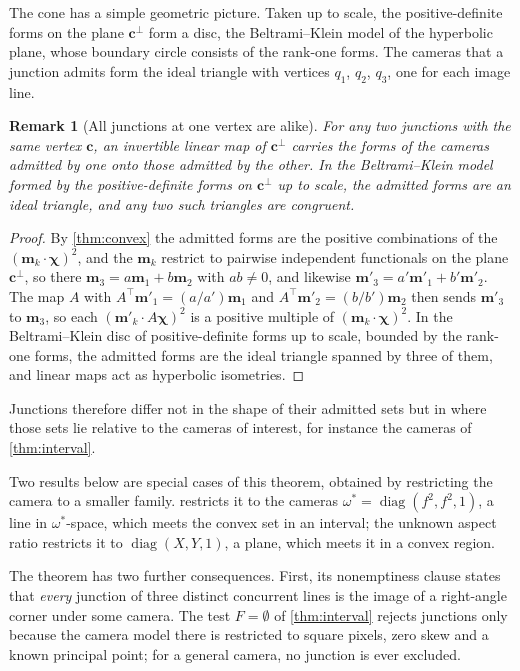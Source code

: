 \documentclass[pdflatex,sn-mathphys-num,iicol]{sn-jnl}
\newcommand{\vc}{\mathbf{c}}
\newcommand{\vm}{\mathbf{m}}
\theoremstyle{thmstyleone}
\theoremstyle{thmstylethree}
\theoremstyle{thmstyletwo}
\newtheorem{remark}[theorem]{Remark}
\begin{document}
The cone has a simple geometric picture. Taken up to scale, the positive-definite forms on the plane $\vc^{\perp}$ form a disc, the Beltrami--Klein model of the hyperbolic plane, whose boundary circle consists of the rank-one forms. The cameras that a junction admits form the ideal triangle with vertices $q_1$, $q_2$, $q_3$, one for each image line.

\begin{remark}[All junctions at one vertex are alike]\label{cor:alike}
For any two junctions with the same vertex $\vc$, an invertible linear map of $\vc^{\perp}$ carries the forms of the cameras admitted by one onto those admitted by the other. In the Beltrami--Klein model formed by the positive-definite forms on $\vc^{\perp}$ up to scale, the admitted forms are an ideal triangle, and any two such triangles are congruent.
\end{remark}
\begin{proof}
By \cref{thm:convex} the admitted forms are the positive combinations of the $(\vm_k\cdot\boldsymbol\chi)^2$, and the $\vm_k$ restrict to pairwise independent functionals on the plane $\vc^{\perp}$, so there $\vm_3=a\vm_1+b\vm_2$ with $ab\neq0$, and likewise $\vm'_3=a'\vm'_1+b'\vm'_2$. The map $A$ with $A^{\top}\vm'_1=(a/a')\vm_1$ and $A^{\top}\vm'_2=(b/b')\vm_2$ then sends $\vm'_3$ to $\vm_3$, so each $(\vm'_k\cdot A\boldsymbol\chi)^2$ is a positive multiple of $(\vm_k\cdot\boldsymbol\chi)^2$. In the Beltrami--Klein disc of positive-definite forms up to scale, bounded by the rank-one forms, the admitted forms are the ideal triangle spanned by three of them, and linear maps act as hyperbolic isometries.
\end{proof}

Junctions therefore differ not in the shape of their admitted sets but in where those sets lie relative to the cameras of interest, for instance the cameras of \cref{thm:interval}.

Two results below are special cases of this theorem, obtained by restricting the camera to a smaller family.  restricts it to the cameras $\omega^{*}=\operatorname{diag}(f^2,f^2,1)$, a line in $\omega^{*}$-space, which meets the convex set in an interval; the unknown aspect ratio restricts it to $\operatorname{diag}(X,Y,1)$, a plane, which meets it in a convex region. 

The theorem has two further consequences. First, its nonemptiness clause states that \emph{every} junction of three distinct concurrent lines is the image of a right-angle corner under some camera. The test $F=\emptyset$ of \cref{thm:interval} rejects junctions only because the camera model there is restricted to square pixels, zero skew and a known principal point; for a general camera, no junction is ever excluded. 
\end{document}
